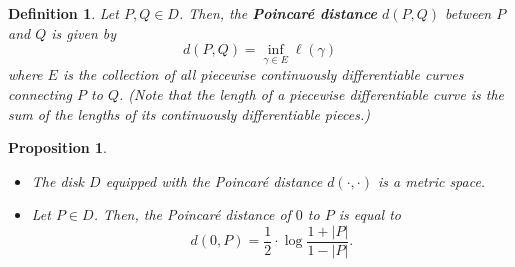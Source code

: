 \documentclass[10pt]{article}
\theoremstyle{plain}
\newtheorem{definition}{Definition}
\newtheorem{proposition}{Proposition}
\begin{document}
		\begin{definition}
			Let $P, Q \in D$. Then, the \textbf{\textit{Poincaré distance}} $d(P, Q)$ between $P$ and $Q$ is given by $$d(P, Q) = \inf_{\gamma \in E} \ell(\gamma)$$ where $E$ is the collection of all piecewise continuously differentiable curves connecting $P$ to $Q$. (Note that the length of a piecewise differentiable curve is the sum of the lengths of its continuously differentiable pieces.)
		\end{definition}
		\begin{proposition} ~
				\begin{itemize}
					\item[(1)] The disk $D$ equipped with the Poincaré distance $d(\cdot, \cdot)$ is a metric space. 
					
					\item[(2)] Let $P \in D$. Then, the Poincaré distance of $0$ to $P$ is equal to $$d(0, P) = \frac{1}{2} \cdot \log \frac{1 + |P|}{1 - |P|}.$$
				\end{itemize}
		\end{proposition}
\end{document}
